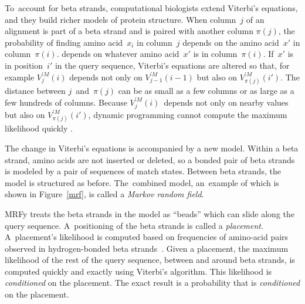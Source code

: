 \documentclass[preprint,nonatbib,blockstyle,times]{sigplanconf}
\newcommand\pairedwith[1]{{\pi(#1)}}
\newcommand\figref[1]{Figure~\ref{#1}}
\let\cite\citep
\begin{document}
To~account for beta strands, computational biologists extend
Viterbi's equations, and they build
richer models of protein structure.
When column~$j$ of an alignment is part of a beta strand and is paired
with another column  $\pairedwith j$,
the probability of finding amino acid~$x_i$ in column~$j$ 
\ifpagetuning
depends on the amino acid~$x'$ in column~${\pairedwith i}$.
\else
depends on whatever amino acid~$x'$  is in column~${\pairedwith i}$.
\fi
If~$x'$ is in position~$i'$ in the query sequence, Viterbi's
equations are altered so that, for example
$V_{j}^{\prime M}(i)$ depends not only on
$V_{j-1}^{\prime M}(i-1)$ but also on
$V_{\pairedwith j}^{\prime M}(i')$.
The distance between $j$~and~$\pairedwith j$ can be as small as a few
columns or as large as a few hundreds of columns.
Because $V_j^{\prime M}(i)$~depends not only on nearby values but also on
$V_{\pairedwith j}^{\prime M}(i')$,
dynamic programming cannot compute the maximum likelihood quickly 
\cite{Menke:2010ti,Daniels:2012}.

The change in Viterbi's equations is accompanied by a new model.
Within a beta strand, amino acids are not inserted or deleted, so
a bonded pair of beta strands is modeled by
 a pair of sequences of match states.
Between beta strands, the model is structured as before.
The~combined model, an~example of which is shown in \figref{mrf}, is called a
\textit{Markov random field}. 


MRFy treats the beta 
strands in the model
 as ``beads'' which can slide along the query sequence.
A~positioning of the beta strands is called
 a \emph{placement}.
A~placement's likelihood is computed
based on frequencies of amino-acid pairs observed in 
hydrogen-bonded beta strands~\cite{Cowen:2002p588}.
Given a placement, the maximum likelihood of the rest of
the query sequence, between and around beta strands,
is computed quickly and exactly 
using Viterbi's algorithm.
\ifpagetuning
This likelihood is \emph{conditioned} on the placement.
\else
The exact result is a probability that is
\emph{conditioned} on the placement.
\fi
\end{document}
